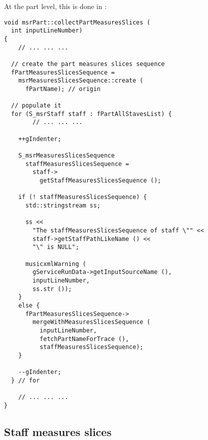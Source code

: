 At the part level, this is done in :
\begin{lstlisting}[language=CPlusPlus]
void msrPart::collectPartMeasuresSlices (
  int inputLineNumber)
{
	// ... ... ...

  // create the part measures slices sequence
  fPartMeasuresSlicesSequence =
    msrMeasuresSlicesSequence::create (
      fPartName); // origin

  // populate it
  for (S_msrStaff staff : fPartAllStavesList) {
		// ... ... ...

    ++gIndenter;

    S_msrMeasuresSlicesSequence
      staffMeasuresSlicesSequence =
        staff->
          getStaffMeasuresSlicesSequence ();

    if (! staffMeasuresSlicesSequence) {
      std::stringstream ss;

      ss <<
        "The staffMeasuresSlicesSequence of staff \"" <<
        staff->getStaffPathLikeName () <<
        "\" is NULL";

      musicxmlWarning (
        gServiceRunData->getInputSourceName (),
        inputLineNumber,
        ss.str ());
    }
    else {
      fPartMeasuresSlicesSequence->
        mergeWithMeasuresSlicesSequence (
          inputLineNumber,
          fetchPartNameForTrace (),
          staffMeasuresSlicesSequence);
    }

    --gIndenter;
  } // for

	// ... ... ...
}
\end{lstlisting}


\subsection{Staff measures slices}

